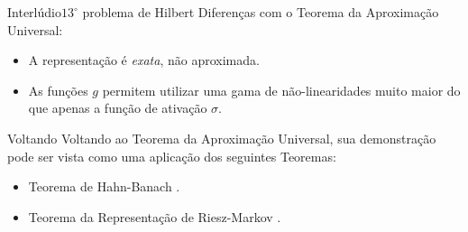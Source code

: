 \documentclass[13pt]{beamer}
\begin{document}
\begin{frame}{Interlúdio}{\( 13^{ \circ } \) problema de Hilbert}
    \vspace{2pt}
    Diferenças com o Teorema da Aproximação Universal:
    \begin{itemize}
        \item<1-> A representação é \emph{exata}, não aproximada.
        \item<2-> As funções \( g \) permitem utilizar uma gama de não-linearidades muito maior do que apenas a função de ativação \( \sigma \).
    \end{itemize}
\end{frame}



\begin{frame}{Voltando}
    Voltando ao Teorema da Aproximação Universal, sua demonstração pode ser vista como uma aplicação dos seguintes Teoremas:
    \begin{itemize}
        \item<2-> Teorema de Hahn-Banach \cite{func-anal}.
        \item<3-> Teorema da Representação de Riesz-Markov \cite{royden}.
    \end{itemize}
\end{frame}


\end{document}
